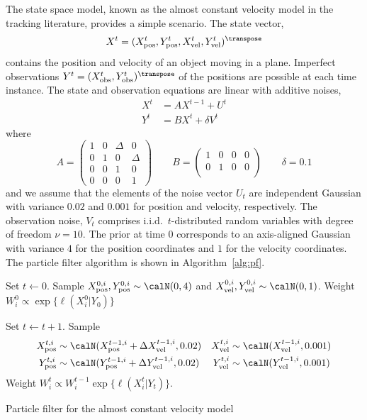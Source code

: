 The state space model, known as the almost constant velocity model in the
tracking literature, provides a simple scenario. The state vector,
\begin{equation*}
  X^t = (\xpos^t, \ypos^t, \xvel^t, \yvel^t)^{\transpose}
\end{equation*}
contains the position and velocity of an object moving in a plane. Imperfect
observations $Y^t = (\xobs^t, \yobs^t)^{\transpose}$ of the positions are
possible at each time instance. The state and observation equations are linear
with additive noises,
\begin{align*}
  X^t &= AX^{t-1} + U^t \\
  Y^t &= BX^t + \delta V^t
\end{align*}
where
\begin{equation*}
  A = \begin{pmatrix}
    1 & 0 & \Delta & 0      \\
    0 & 1 & 0      & \Delta \\
    0 & 0 & 1      & 0      \\
    0 & 0 & 0      & 1
  \end{pmatrix} \qquad
  B = \begin{pmatrix}
    1 & 0 & 0 & 0 \\
    0 & 1 & 0 & 0 \\
  \end{pmatrix} \qquad
  \delta = 0.1
\end{equation*}
and we assume that the elements of the noise vector $U_t$ are independent
Gaussian with variance $0.02$ and $0.001$ for position and velocity,
respectively. The observation noise, $V_t$ comprises i.i.d.\ $t$-distributed
random variables with degree of freedom $\nu = 10$. The prior at time $0$
corresponds to an axis-aligned Gaussian with variance $4$ for the position
coordinates and $1$ for the velocity coordinates. The particle filter algorithm
is shown in Algorithm~\ref{alg:pf}.

\begin{algorithm}[t]
  \begin{algorithmic}
    \tophrule
    \STATE {}
    \STATE Set $t\leftarrow0$.
    \STATE Sample $\xpos^{0,i},\ypos^{0,i}\sim\calN(0,4)$ and
    $\xvel^{0,i},\yvel^{0,i}\sim\calN(0,1)$.
    \STATE Weight $W_i^0 \propto \exp\{\ell(X_i^0|Y_0)\}$

    \REPEAT
    \STATE {}
    \STATE Set $t\leftarrow t + 1$.
    \STATE Sample
    \begin{align*}
      \xpos^{t,i}&\sim\calN(\xpos^{t-1,i} + \Delta\xvel^{t-1,i}, 0.02) &
      \xvel^{t,i}&\sim\calN(\xvel^{t-1,i}, 0.001) \\
      \ypos^{t,i}&\sim\calN(\ypos^{t-1,i} + \Delta\yvel^{t-1,i}, 0.02) &
      \yvel^{t,i}&\sim\calN(\yvel^{t-1,i}, 0.001)
    \end{align*}
    \STATE Weight $W_i^t \propto W_i^{t - 1}\exp\{\ell(X_i^t|Y_t)\}$.
    \bottomhrule
  \end{algorithmic}
  \caption{Particle filter for the almost constant velocity model}
  \label{alg:pf}
\end{algorithm}

